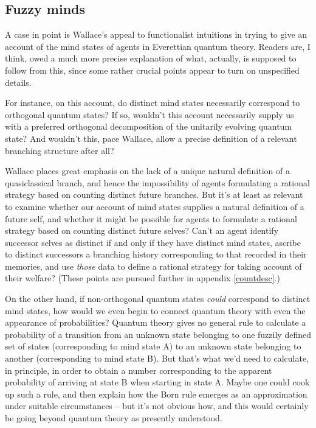 \documentclass[aps,
pra,epsfig]{revtex4}
\begin{document}
\subsection{Fuzzy minds}

A case in point is Wallace's appeal to functionalist intuitions in 
trying to give an account of the 
mind states of agents in Everettian quantum theory.
Readers are, I think, owed a much more precise explanation of what, actually, 
is supposed to follow from this, since
some rather crucial points appear to turn on unspecified details. 

For instance, on this account, do 
distinct mind states necessarily correspond to orthogonal quantum states?
If so, wouldn't this account necessarily supply us with a 
preferred orthogonal decomposition of the unitarily evolving 
quantum state?   And wouldn't this, pace Wallace\cite{wallacevolone}, 
allow a precise definition of a relevant branching structure after all?   

Wallace places great emphasis on the lack of a 
unique natural definition of a quasiclassical branch, and hence
the impossibility of agents formulating a rational strategy based
on counting distinct future branches.    
But it's at least as relevant to examine whether our account 
of mind states supplies a natural definition of a future self, and 
whether it might be possible for agents to formulate a rational 
strategy based on counting distinct future
selves?   Can't an agent identify successor selves as distinct if and 
only if they have distinct mind states, ascribe to distinct successors
a branching history corresponding to that recorded in their memories,
and use {\it those} data to define a rational strategy for taking account
of their welfare? (These points are pursued further in appendix
\ref{countdesc}.)  

On the other hand, if non-orthogonal quantum states {\it could} correspond to 
distinct mind states, how would we even begin to 
connect quantum theory with even the appearance of probabilities?   
Quantum theory gives no general rule to calculate a 
probability of a transition from an 
unknown state belonging to one fuzzily defined set of states 
(corresponding to mind state A) to an unknown state belonging to another
(corresponding to mind state B).   But that's what we'd need to calculate,
in principle, in order to obtain a number corresponding to the apparent 
probability of arriving at state B when starting in state A.   
Maybe one could cook up such a rule, and then explain how the Born
rule emerges as an approximation under suitable circumstances -- but
it's not obvious how, and this would certainly be going beyond 
quantum theory as presently understood.  
\end{document}
